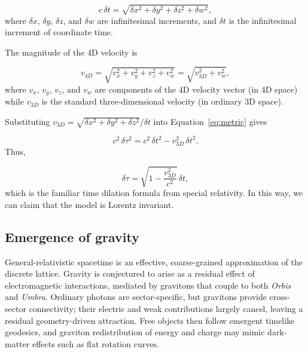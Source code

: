 \documentclass{ijuc}
\begin{document}
\begin{equation}
\label{eq:metric}
c \, \delta t = \sqrt{ \delta x^{2} + \delta y^{2} + \delta z^{2} + \delta w^{2} },
\end{equation}
where $\delta x$, $\delta y$, $\delta z$, and $\delta w$ are infinitesimal increments, and $\delta t$ is the infinitesimal increment of coordinate time.

The magnitude of the 4D velocity is

\begin{equation}
v_{4D} = \sqrt{ v_{x}^{2} + v_{y}^{2} + v_{z}^{2} + v_{w}^{2} } = \sqrt{ v_{3D}^{2} + v_{w}^{2} },
\end{equation}
where $v_{x}$, $v_{y}$, $v_{z}$, and $v_{w}$ are components of the 4D velocity vector (in
4D space) while $v_{3D}$ is the standard three-dimensional velocity (in ordinary 3D space).

Substituting $v_{3D} = \sqrt{\delta x^{2} + \delta y^{2} + \delta z^{2}}/\delta t$ into Equation~\eqref{eq:metric} gives

\begin{equation}
c^{2} \, \delta \tau^{2} = c^{2} \, \delta t^{2} - v_{3D}^{2} \, \delta t^{2}.
\end{equation}
Thus,

\begin{equation}
\delta \tau = \sqrt{ 1 - \frac{v_{3D}^{2}}{c^{2}} } \, \delta t,
\label{eq:timedilation}
\end{equation}
which is the familiar time dilation formula from special relativity. 
In this way, we can claim that the model is Lorentz invariant.

\subsection{Emergence of gravity}\label{subsec:emergence-of-gravity}

General-relativistic spacetime is an effective, coarse-grained approximation of the discrete lattice. Gravity is conjectured to arise as a residual effect of electromagnetic interactions, mediated by gravitons that couple to both \emph{Orbis} and \emph{Umbra}. Ordinary photons are sector-specific, but gravitons provide cross-sector connectivity; their electric and weak contributions largely cancel, leaving a residual geometry-driven attraction. Free objects then follow emergent timelike geodesics, and graviton redistribution of energy and charge may mimic dark-matter effects such as flat rotation curves.
\end{document}
